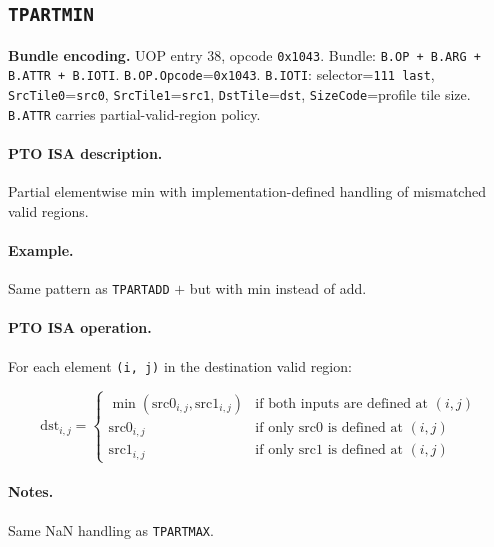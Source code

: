 \subsection{\texttt{TPARTMIN}}
\noindent\textbf{Bundle encoding.} UOP entry 38, opcode \texttt{0x1043}. Bundle: \texttt{B.OP + B.ARG + B.ATTR + B.IOTI}. \texttt{B.OP.Opcode}=\texttt{0x1043}. \texttt{B.IOTI}: selector=\texttt{111 last}, \texttt{SrcTile0}=\texttt{src0}, \texttt{SrcTile1}=\texttt{src1}, \texttt{DstTile}=\texttt{dst}, \texttt{SizeCode}=profile tile size. \texttt{B.ATTR} carries partial-valid-region policy.\par\smallskip
{\small
\paragraph{PTO ISA description.}
Partial elementwise min with implementation-defined handling of mismatched valid regions.
\paragraph{Example.}
Same pattern as \texttt{TPARTADD} $+$ but with min instead of add.
\par\smallskip
\paragraph{PTO ISA operation.}
For each element \texttt{(i, j)} in the destination valid region:

\[
\mathrm{dst}_{i,j} =
\begin{cases}
\min(\mathrm{src0}_{i,j}, \mathrm{src1}_{i,j}) & \text{if both inputs are defined at } (i,j) \\
\mathrm{src0}_{i,j} & \text{if only src0 is defined at } (i,j) \\
\mathrm{src1}_{i,j} & \text{if only src1 is defined at } (i,j)
\end{cases}
\]
}\par\smallskip
\paragraph{Notes.}
Same NaN handling as \texttt{TPARTMAX}.
